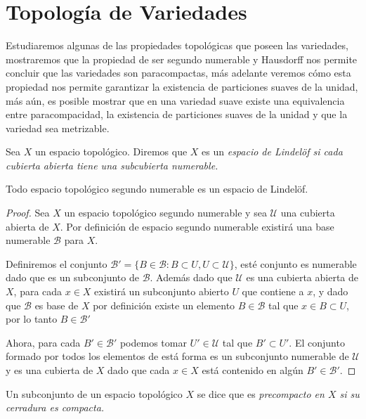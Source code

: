 \appendix
\chapter{Topología de Variedades}\label{Anexo: Topologia De Variedades}
Estudiaremos algunas de las propiedades topológicas que poseen las variedades, mostraremos que la propiedad de ser segundo numerable y Hausdorff nos permite concluir que las variedades son paracompactas, más adelante veremos cómo esta propiedad nos permite garantizar la existencia de particiones suaves de la unidad, más aún, es posible mostrar que en una variedad suave existe una equivalencia entre paracompacidad, la existencia de particiones suaves de la unidad y que la variedad sea metrizable.

\begin{definition}\label{Definición: Lindelöf}
  Sea $X$ un espacio topológico. Diremos que $X$ es un \it{espacio de Lindelöf} si cada cubierta abierta tiene una subcubierta numerable.
\end{definition}

\begin{theorem}
  Todo espacio topológico segundo numerable es un espacio de Lindelöf.
\end{theorem}

\begin{proof}
  Sea $X$ un espacio topológico segundo numerable y sea $\mathcal{U}$ una cubierta abierta de $X$. Por definición de espacio segundo numerable existirá una base numerable $\mathcal{B}$ para $X$.

  Definiremos el conjunto $\mathcal{B}' = \{B \in \mathcal{B} : B \subset U, U \subset \mathcal{U}\}$, esté conjunto es numerable dado que es un subconjunto de $\mathcal{B}$. Además dado que $\mathcal{U}$ es una cubierta abierta de $X$, para cada $x \in X$ existirá un subconjunto abierto $U$ que contiene a $x$, y dado que $\mathcal{B}$ es base de $X$ por definición existe un elemento $B \in \mathcal{B}$ tal que $x \in B \subset U$, por lo tanto $B \in \mathcal{B}'$

  Ahora, para cada $B' \in \mathcal{B}'$ podemos tomar $U' \in \mathcal{U}$ tal que $B' \subset U'$. El conjunto formado por todos los elementos de está forma es un subconjunto numerable de $\mathcal{U}$ y es una cubierta de $X$ dado que cada $x \in X$ está contenido en algún $B' \in \mathcal{B}'$.
\end{proof}

\begin{definition}\label{Definición: Subconjunto Precompacto}
  Un subconjunto de un espacio topológico $X$ se dice que es \it{precompacto} en $X$ si su cerradura es compacta. 
\end{definition} 


